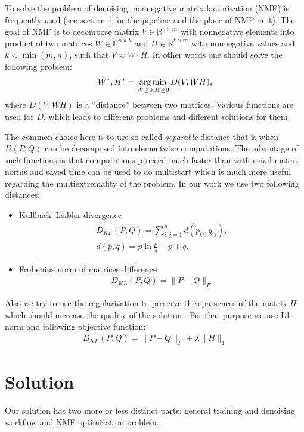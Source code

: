 \documentclass[11pt]{article}
\newcommand{\argmin}{\mathop{\rm arg\,min}\limits} %
\begin{document}
To solve the problem of denoising, nonnegative matrix factorization (NMF) is frequently used (see section \ref{sec:solution} for the pipeline and the place of NMF in it). The goal of NMF is to decompose matrix $V \in \mathbb{R}^{n \times m}$ with nonnegative elements into product of two matrices $W \in \mathbb{R}^{n \times k}$ and $H \in \mathbb{R}^{k \times m}$ with nonnegative values and $k < \min(m,n)$, such that $V \approx W \cdot H$. In other words one should solve the following problem:
$$
W^*,H^* = \argmin_{W \geq 0, H \geq 0} D(V, WH),
$$
where $D(V, WH)$ is a “distance” between two matrices. Various functions are used for $D$, which leads to different problems and different solutions for them. 

The common choice here is to use so called \textit{separable} distance that is when $D(P, Q)$ can be decomposed into elementwise computations. The advantage of such functions is that computations proceed much faster than with usual matrix norms and saved time can be used to do multistart which is much more useful regarding the multiextremality of the problem. In our work we use two following distances:
\begin{itemize}
\item Kullback–Leibler divergence
\begin{gather*}
D_{KL}(P,Q) = \sum_{i,j = 1}^{n}d(p_{ij}, q_{ij}), \\
d(p, q) = p \ln \frac{p}{q} − p + q.
\end{gather*}
\item Frobenius norm of matrices difference
\begin{gather*}
D_{KL}(P,Q) = \|P - Q\|_{F}
\end{gather*}
\end{itemize}
Also we try to use the regularization to preserve the sparseness of the matrix $H$ which should increase the quality of the solution \cite{cauchi}. For that purpose we use L1-norm and following objective function:
\begin{gather*}
D_{KL}(P,Q) = \|P - Q\|_{F} + \lambda \|H\|_1
\end{gather*}

\section{Solution} \label{sec:solution}

Our solution has two more or less distinct parts: general training and denoising workflow and NMF optimization problem.
\end{document}

